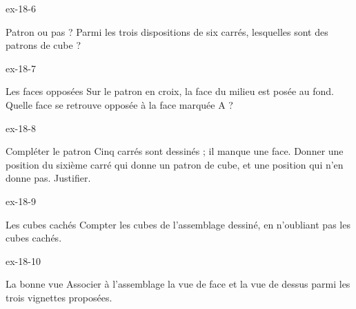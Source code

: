 \begin{blocLivre}{ex-18-6}\begin{exercice}[2]{Patron ou pas ?}
Parmi les trois dispositions de six carrés, lesquelles sont des patrons de cube ?
\label{fig-ex-18-6}
\end{exercice}\end{blocLivre}
\begin{blocLivre}{ex-18-7}\begin{exercice}[2]{Les faces opposées}
Sur le patron en croix, la face du milieu est posée au fond. Quelle face se retrouve opposée à la face marquée A ?
\label{fig-ex-18-7}
\end{exercice}\end{blocLivre}
\begin{blocLivre}{ex-18-8}\begin{exercice}[2]{Compléter le patron}
Cinq carrés sont dessinés ; il manque une face. Donner une position du sixième carré qui donne un patron de cube, et une position qui n’en donne pas. Justifier.
\label{fig-ex-18-8}
\end{exercice}\end{blocLivre}
\begin{blocLivre}{ex-18-9}\begin{exercice}[2]{Les cubes cachés}
Compter les cubes de l’assemblage dessiné, en n’oubliant pas les cubes cachés.
\label{fig-ex-18-9}
\end{exercice}\end{blocLivre}
\begin{blocLivre}{ex-18-10}\begin{exercice}[2]{La bonne vue}
Associer à l’assemblage la vue de face et la vue de dessus parmi les trois vignettes proposées.
\label{fig-ex-18-10}
\end{exercice}\end{blocLivre}

